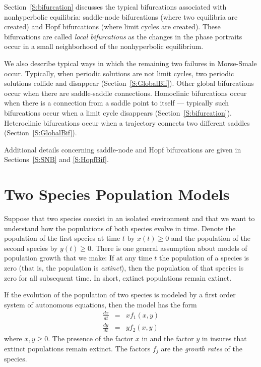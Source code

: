 \documentclass{ximera}
\begin{document}
Section~\ref{S:bifurcation} discusses the typical bifurcations associated 
with nonhyperbolic equilibria: saddle-node bifurcations (where two equilibria 
are created) and Hopf bifurcations (where limit cycles are created).  These 
bifurcations are called {\em local bifurcations\/} as the changes in the phase 
portraits occur in a small neighborhood of the nonhyperbolic equilibrium.  

We also describe typical ways in which the remaining two failures in 
Morse-Smale occur.  Typically, when periodic solutions are not limit cycles, 
two periodic solutions collide and disappear (Section~\ref{S:GlobalBif}).  
Other global bifurcations occur when there are saddle-saddle connections.  
Homoclinic bifurcations occur when there is a connection from a saddle point 
to itself --- typically such bifurcations occur when a limit cycle disappears
(Section~\ref{S:bifurcation}).   Heteroclinic bifurcations occur when a 
trajectory connects two different saddles (Section~\ref{S:GlobalBif}).

Additional details concerning saddle-node and Hopf bifurcations are given in 
Sections~\ref{S:SNB} and \ref{S:HopfBif}.




\section{Two Species Population Models}
\label{S:TSPM} 

Suppose that two species coexist in an isolated environment and
that we want to understand how the populations of both species
evolve in time.  Denote the population of the first species at time 
$t$ by $x(t)\ge 0$ and the population of the second species
by $y(t)\ge 0$.  There is one general assumption about models of
population growth that we make: If at any time $t$ the
population of a species is zero (that is, the population is {\em
extinct\/}), then the population of that species is zero for all
subsequent time.  In short, extinct populations remain extinct.

If the evolution of the population of two species is modeled by a
first order system of autonomous equations, then the model has the form
\begin{eqnarray}
\frac{dx}{dt} & = & xf_1(x,y) \label{e:pop1a} \\
\frac{dy}{dt} & = & yf_2(x,y) \label{e:pop1b}
\end{eqnarray}  
where $x,y \ge 0$.
The presence of the factor $x$ in  and the factor
$y$ in  insures that extinct populations remain
extinct. The factors $f_j$ are the {\em growth rates\/} of the 
species.
\end{document}
